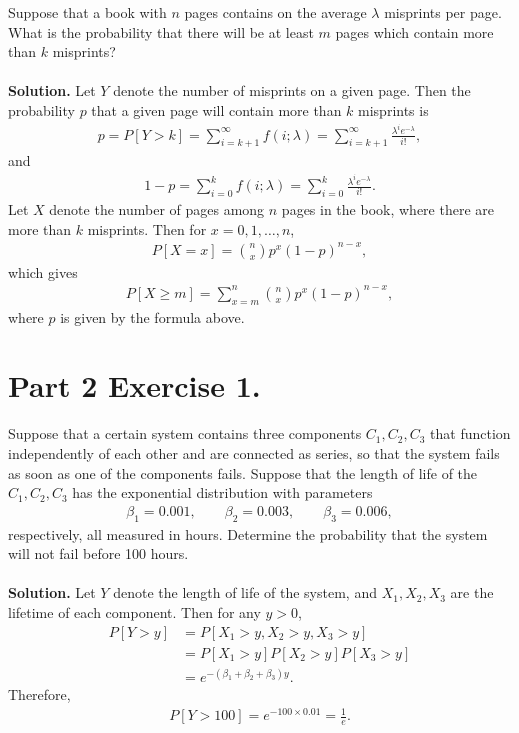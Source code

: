 Suppose that a book with $n$ pages contains on the average $\lambda$ misprints per page. What is the probability that there will be at least $m$ pages which contain more than $k$ misprints? \\
~\\
\textbf{Solution.} Let $Y$ denote the number of misprints on a given page. Then the probability $p$ that a given page will contain more than $k$ misprints is
\begin{align*}
p = P[Y > k] = \sum_{i=k+1}^{\infty} f(i; \lambda) = \sum_{i=k+1}^{\infty} \frac{\lambda^i e^{-\lambda}}{i!},
\end{align*}
and
\begin{align*}
1 - p = \sum_{i=0}^k f(i; \lambda) = \sum_{i=0}^{k} \frac{\lambda^i e^{-\lambda}}{i!}.
\end{align*}
Let $X$ denote the number of pages among $n$ pages in the book, where there are more than $k$ misprints. Then for $x = 0, 1, \ldots, n$,
\begin{align*}
P[X = x] = \binom{n}{x} p^x(1-p)^{n-x},
\end{align*}
which gives
\begin{align*}
P[X\geq m] = \sum_{x=m}^n \binom{n}{x} p^x(1-p)^{n-x},
\end{align*}
where $p$ is given by the formula above.


\section*{Part 2 Exercise 1.}

Suppose that a certain system contains three components $C_1, C_2, C_3$ that function independently of each other and are connected as series, so that the system fails as soon as one of the components fails. Suppose that the length of life of the $C_1, C_2, C_3$ has the exponential distribution with parameters
\begin{align*}
\beta_1 = 0.001, \qquad \beta_2 = 0.003, \qquad \beta_3 = 0.006,
\end{align*}
respectively, all measured in hours. Determine the probability that the system will not fail before 100 hours.\\
~\\
\textbf{Solution.} Let $Y$ denote the length of life of the system, and $X_1, X_2, X_3$ are the lifetime of each component. Then for any $y > 0$,
\begin{align*}
P[Y > y] & = P[X_1 > y, X_2 > y, X_3 > y] \\
& = P[X_1 > y]P[X_2 > y]P[X_3 > y] \\
& = e^{-(\beta_1 + \beta_2 + \beta_3)y}.
\end{align*}
Therefore,
\begin{align*}
P[Y > 100] = e^{-100\times 0.01} = \frac{1}{e}.
\end{align*}


